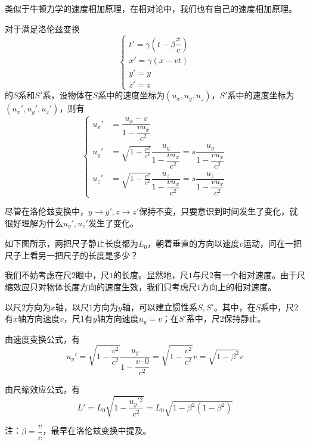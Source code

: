 \subsection[速度变换]{}
类似于牛顿力学的速度相加原理，在相对论中，我们也有自己的速度相加原理。
\begin{law}
    对于满足洛伦兹变换
    \[\left\{\begin{array}{l}
            t'=\gamma(t-\beta\dfrac{x}{c}) \\
            x'=\gamma(x-vt)                \\
            y'=y                           \\
            z'=z
        \end{array}\right.\]
    的$S$系和$S'$系，设物体在$S$系中的速度坐标为$(u_x,u_y,u_z)$，$S'$系中的速度坐标为$(u_x',u_y',u_z')$，则有
    \[
        \left\{\begin{aligned}
            u_x' & =\dfrac{u_x-v}{1-\dfrac{vu_x}{c^2}}                                                         \\[1ex]
            u_y' & =\sqrt{1-\frac{v^2}{c^2}}\dfrac{u_y}{1-\dfrac{vu_x}{c^2}}=s\dfrac{u_y}{1-\dfrac{vu_x}{c^2}} \\[1ex]
            u_z' & =\sqrt{1-\frac{v^2}{c^2}}\dfrac{u_z}{1-\dfrac{vu_x}{c^2}}=s\dfrac{u_z}{1-\dfrac{vu_x}{c^2}}
        \end{aligned}\right.
    \]
\end{law}
尽管在洛伦兹变换中，$y\rightarrow y',z\rightarrow z'$保持不变，只要意识到时间发生了变化，就很好理解为什么$u_y',u_z'$发生了变化。
\begin{ex}
    如下图所示，两把尺子静止长度都为$L_0$，朝着垂直的方向以速度$v$运动，问在一把尺子上看另一把尺子的长度是多少？
\end{ex}
\begin{so}

    我们不妨考虑在尺$2$眼中，尺$1$的长度。显然地，尺$1$与尺$2$有一个相对速度。由于尺缩效应只对物体长度方向的速度生效，我们只考虑尺$1$方向上的相对速度。

    以尺$2$方向为$x$轴，以尺$1$方向为$y$轴，可以建立惯性系$S,S'$。其中，在$S$系中，尺$2$有$x$轴方向速度$v$，尺$1$有$y$轴方向速度$u_y=v$；在$S'$系中，尺$2$保持静止。

    由速度变换公式，有
    \[u_y'=\sqrt{1-\dfrac{v^2}{c^2}}\dfrac{u_y}{1-\dfrac{v\cdot 0}{c^2}}=\sqrt{1-\dfrac{v^2}{c^2}}v=\sqrt{1-\beta^2}v\]

    由尺缩效应公式，有
    \[L'=L_0\sqrt{1-\dfrac{u_y'{}^2}{c^2}}=L_0\sqrt{1-\beta^2(1-\beta^2)}\]

    注：$\beta=\dfrac{v}{c}$，最早在洛伦兹变换中提及。

\end{so}
